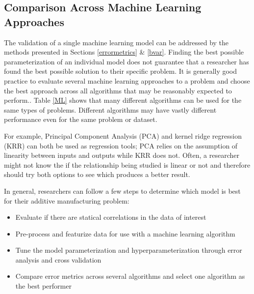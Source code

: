 \subsection{Comparison Across Machine Learning Approaches}\label{comparison}
The validation of a single machine learning model can be addressed by the methods presented in Sections \ref{errormetrics} \& \ref{bvar}. Finding the best possible parameterization of an individual model does not guarantee that a researcher has found the best possible solution to their specific problem. It is generally good practice to evaluate several machine learning approaches to a problem and choose the best approach across all algorithms that may be reasonably expected to perform.. Table \ref{ML} shows that many different algorithms can be used for the same types of problems. Different algorithms may have vastly different performance even for the same problem or dataset.

For example, Principal Component Analysis (PCA) and kernel ridge regression (KRR) can both be used as regression tools; PCA relies on the assumption of linearity between inputs and outputs while KRR does not. Often, a researcher might not know the if the relationship being studied is linear or not and therefore should try both options to see which produces a better result.

In general, researchers can follow a few steps to determine which model is best for their additive manufacturing problem:
\begin{itemize}
	\item Evaluate if there are statical correlations in the data of interest 
	\item Pre-process and featurize data for use with a machine learning algorithm
	\item Tune the model parameterization and hyperparameterization through error analysis and cross validation
	\item Compare error metrics across several algorithms and select one algorithm as the best performer
\end{itemize}

